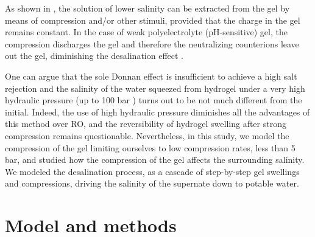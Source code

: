 \documentclass[journal,article,submit,pdftex,moreauthors]{Definitions/mdpi}
\begin{document}
As shown in \cite{Li2011, Ali2015, Arens_2017, Fengler_2020}, the solution of lower salinity can be extracted from the gel by means of compression and/or other stimuli, provided that the charge in the gel remains constant.
In the case of weak polyelectrolyte (pH-sensitive) gel, the compression discharges the gel and therefore the neutralizing counterions leave out the gel, diminishing the desalination effect \cite{Rud2018}.

One can argue that the sole Donnan effect is insufficient to achieve a high salt rejection \cite{Cai2016} and the salinity of the water squeezed from hydrogel under a very high hydraulic pressure (up to 100 bar \cite{Fengler_2020}) turns out to be not much different from the initial.
Indeed, the use of high hydraulic pressure diminishes all the advantages of this method over RO, and the reversibility of hydrogel swelling after strong compression remains questionable.
Nevertheless, in this study, we model the compression of the gel limiting ourselves to low compression rates, less than 5 bar, and studied how the compression of the gel affects the surrounding salinity.
We modeled the desalination process, as a cascade of step-by-step gel swellings and compressions, driving the salinity of the supernate down to potable water.

\section{Model and methods\label{sec: theory}}

\end{document}
